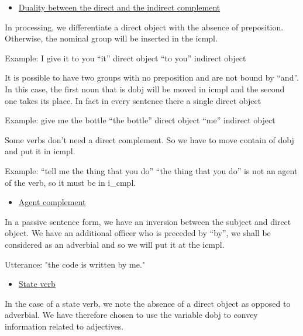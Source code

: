 \documentclass[twoside,a4paper,10pt]{report}
\begin{document}
\begin{itemize}
    \item  \underline{Duality between the direct and the indirect complement}
\end{itemize}
In processing, we differentiate a direct object with the absence of preposition. Otherwise, the nominal group will be inserted in the i{\textunderscore}cmpl.


\small
\begin{verbatimtab}
  Example: I give it to you	
  “it” direct object
  “to you” indirect object
\end{verbatimtab}
\normalsize
It is possible to have two groups with no preposition and are not bound by “and”. In this case, the first noun that is d{\textunderscore}obj will be moved in i{\textunderscore}cmpl and the second one takes its place. In fact in every sentence there a single direct object


\small
\begin{verbatimtab}
  Example: give me the bottle
  “the bottle” direct object
  “me” indirect object
\end{verbatimtab}
\normalsize
Some verbs don’t need a direct complement. So we have to move contain of d{\textunderscore}obj and put it in i{\textunderscore}cmpl.


\small
\begin{verbatimtab}
  Example: “tell me the thing that you do”
  “the thing that you do” is not an agent of the verb, so it must be in i_cmpl.
\end{verbatimtab}
\normalsize

\begin{itemize}
    \item  \underline{Agent complement}
\end{itemize}
In a passive sentence form, we have an inversion between the subject and direct object. We have an additional officer who is preceded by “by”, we shall be considered as an adverbial and so we will put it at the i{\textunderscore}cmpl.


\small
\begin{verbatimtab}
  Utterance: "the code is written by me."
\end{verbatimtab}
\normalsize

\begin{itemize}
    \item  \underline{State verb}
\end{itemize}
In the case of a state verb, we note the absence of a direct object as opposed to adverbial. We have therefore chosen to use the variable d{\textunderscore}obj to convey information related to adjectives.
\end{document}
